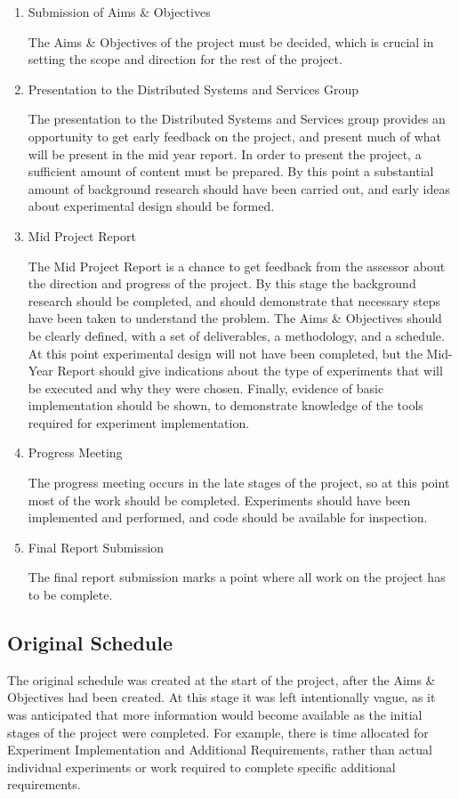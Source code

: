 \begin{enumerate}
	\item Submission of Aims \& Objectives

	The Aims \& Objectives of the project must be decided, which is crucial in setting the scope and direction for the rest of the project.

	\item Presentation to the Distributed Systems and Services Group

	The presentation to the Distributed Systems and Services group provides an opportunity to get early feedback on the project, and present much of what will be present in the mid year report. In order to present the project, a sufficient amount of content must be prepared. By this point a substantial amount of background research should have been carried out, and early ideas about experimental design should be formed.

	\item Mid Project Report

	The Mid Project Report is a chance to get feedback from the assessor about the direction and progress of the project. By this stage the background research should be completed, and should demonstrate that necessary steps have been taken to understand the problem. The Aims \& Objectives should be clearly defined, with a set of deliverables, a methodology, and a schedule. At this point experimental design will not have been completed, but the Mid-Year Report should give indications about the type of experiments that will be executed and why they were chosen. Finally, evidence of basic implementation should be shown, to demonstrate knowledge of the tools required for experiment implementation. 

	\item Progress Meeting

	The progress meeting occurs in the late stages of the project, so at this point most of the work should be completed. Experiments should have been implemented and performed, and code should be available for inspection.

	\item Final Report Submission
	
	The final report submission marks a point where all work on the project has to be complete. 
\end{enumerate}

\subsection{Original Schedule}
The original schedule was created at the start of the project, after the Aims \& Objectives had been created. At this stage it was left intentionally vague, as it was anticipated that more information would become available as the initial stages of the project were completed. For example, there is time allocated for Experiment Implementation and Additional Requirements, rather than actual individual experiments or work required to complete specific additional requirements.

